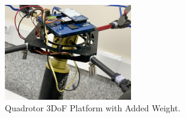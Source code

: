 \documentclass[3p,times]{elsarticle}
\begin{document}
\begin{figure}[H]
	\centering
	\includegraphics[width=0.49\textwidth]{../Figure/implementation/weight/Quad_with_weight.jpg}
	\caption{Quadrotor 3DoF Platform with Added Weight.}
	\label{fig:quadrotor_with_weight}
 \end{figure}
\begin{figure}[H]
	\centering
	\hfill

\end{figure}
\end{document}
